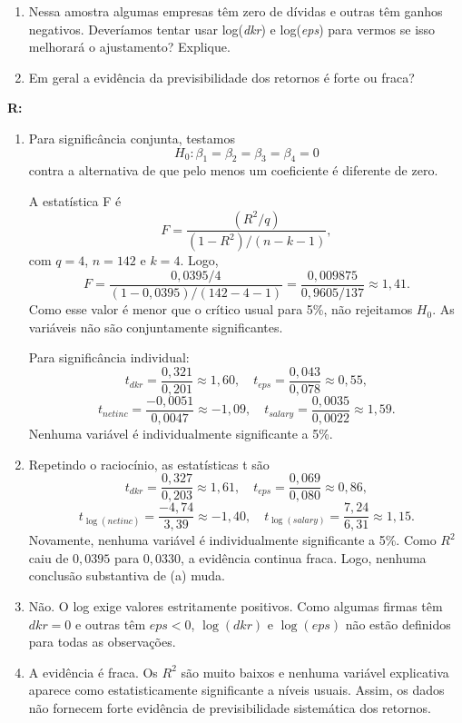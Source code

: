 \documentclass[12pt,letterpaper, onecolumn]{exam}
\renewenvironment{solution}
  {\par\noindent\textbf{R:}\enspace\color{blue}}
  {\par\color{black}}
\begin{document}
\begin{questions}
\begin{enumerate}[label = (\alph*)]
    \item Nessa amostra algumas empresas têm zero de dívidas e outras têm ganhos negativos. Deveríamos tentar usar log(\textit{dkr}) e log(\textit{eps}) para vermos se isso melhorará o ajustamento? Explique.
    \item Em geral a evidência da previsibilidade dos retornos é forte ou fraca?
\end{enumerate}
\begin{solution}
\begin{enumerate}[label=(\alph*)]
    \item Para significância conjunta, testamos
    \[
    H_0:\beta_1=\beta_2=\beta_3=\beta_4=0
    \]
    contra a alternativa de que pelo menos um coeficiente é diferente de zero.

    A estatística F é
    \[
    F=\frac{(R^2/q)}{(1-R^2)/(n-k-1)},
    \]
    com \(q=4\), \(n=142\) e \(k=4\). Logo,
    \[
    F=\frac{0,0395/4}{(1-0,0395)/(142-4-1)}
    =\frac{0,009875}{0,9605/137}
    \approx 1,41.
    \]
    Como esse valor é menor que o crítico usual para 5\%, não rejeitamos \(H_0\). As variáveis não são conjuntamente significantes.

    Para significância individual:
    \[
    t_{dkr}=\frac{0,321}{0,201}\approx 1,60,
    \quad
    t_{eps}=\frac{0,043}{0,078}\approx 0,55,
    \]
    \[
    t_{netinc}=\frac{-0,0051}{0,0047}\approx -1,09,
    \quad
    t_{salary}=\frac{0,0035}{0,0022}\approx 1,59.
    \]
    Nenhuma variável é individualmente significante a 5\%.

    \item Repetindo o raciocínio, as estatísticas t são
    \[
    t_{dkr}=\frac{0,327}{0,203}\approx 1,61,
    \quad
    t_{eps}=\frac{0,069}{0,080}\approx 0,86,
    \]
    \[
    t_{\log(netinc)}=\frac{-4,74}{3,39}\approx -1,40,
    \quad
    t_{\log(salary)}=\frac{7,24}{6,31}\approx 1,15.
    \]
    Novamente, nenhuma variável é individualmente significante a 5\%. Como \(R^2\) caiu de \(0,0395\) para \(0,0330\), a evidência continua fraca. Logo, nenhuma conclusão substantiva de (a) muda.

    \item Não. O log exige valores estritamente positivos. Como algumas firmas têm \(dkr=0\) e outras têm \(eps<0\), \(\log(dkr)\) e \(\log(eps)\) não estão definidos para todas as observações.

    \item A evidência é fraca. Os \(R^2\) são muito baixos e nenhuma variável explicativa aparece como estatisticamente significante a níveis usuais. Assim, os dados não fornecem forte evidência de previsibilidade sistemática dos retornos.
\end{enumerate}
\end{solution}
\
\



\end{questions}
\end{document}
